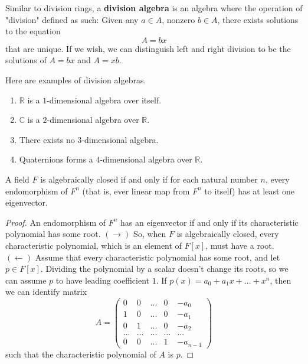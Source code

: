   \begin{definition}
    Similar to division rings, a \textbf{division algebra} is an algebra where the operation of "division" defined as such: Given any $a \in A$, nonzero $b \in A$, there exists solutions to the equation
    \begin{equation}
      A = bx
    \end{equation}
    that are unique. If we wish, we can distinguish left and right division to be the solutions of $A = b x$ and $A = x b$. 
  \end{definition}

  \begin{definition}
    Here are examples of division algebras.
    \begin{enumerate}
      \item $\mathbb{R}$ is a $1$-dimensional algebra over itself. 
      \item $\mathbb{C}$ is a $2$-dimensional algebra over $\mathbb{R}$. 
      \item There exists no $3$-dimensional algebra. 
      \item Quaternions forms a $4$-dimensional algebra over $\mathbb{R}$. 
    \end{enumerate}
  \end{definition}

  \begin{theorem}
    A field $F$ is algebraically closed if and only if for each natural number $n$, every endomorphism of $F^n$ (that is, ever linear map from $F^n$ to itself) has at least one eigenvector. 
  \end{theorem}
  \begin{proof}
    An endomorphism of $F^n$ has an eigenvector if and only if its characteristic polynomial has some root. $(\rightarrow)$ So, when $F$ is algebraically closed, every characteristic polynomial, which is an element of $F[x]$, must have a root. $(\leftarrow)$ Assume that every characteristic polynomial has some root, and let $p \in F[x]$. Dividing the polynomial by a scalar doesn't change its roots, so we can assume $p$ to have leading coefficient $1$. If $p(x) = a_0 + a_1 x + ... + x^n$, then we can identify matrix 
    \begin{equation}
      A = \begin{pmatrix}
      0 & 0 & ... & 0 & -a_0 \\
      1 & 0 & ... & 0 & -a_1 \\
      0 & 1 & ... & 0 & -a_2 \\
      ... & ... & ... & ... & ... \\
      0 & 0 & ... & 1 & -a_{n-1}
      \end{pmatrix}
    \end{equation}
    such that the characteristic polynomial of $A$ is $p$. 
  \end{proof}


